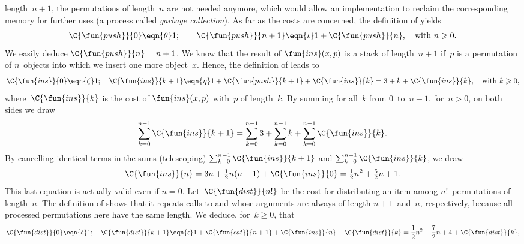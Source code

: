 length~\(n+1\), the permutations of length~\(n\) are not needed
anymore, which would allow an implementation to reclaim the
corresponding memory for further uses (a process called \emph{garbage
  collection}). As far as the costs are
concerned, the definition of  yields
\begin{equation*}
\C{\fun{push}}{0} \eqn{\theta} 1;\qquad
\C{\fun{push}}{n+1} \eqn{\iota} 1 + \C{\fun{push}}{n},\quad
\text{with \(n \geqslant 0\)}.
\end{equation*}
We easily deduce \(\C{\fun{push}}{n} = n +
1\). We know that the result of
\(\fun{ins}(x,p)\) is a stack of length~\(n+1\) if~\(p\) is a
permutation of \(n\)~objects into which we insert one more
object~\(x\). Hence, the definition of  leads to
\begin{equation*}
\C{\fun{ins}}{0}   \eqn{\zeta} 1;\quad
\C{\fun{ins}}{k+1} \eqn{\eta} 1 + \C{\fun{push}}{k+1} +
\C{\fun{ins}}{k} = 3 + k + \C{\fun{ins}}{k}, \quad \text{with \(k
                   \geqslant 0\)},
\end{equation*}
where~\(\C{\fun{ins}}{k}\) is the cost of \(\fun{ins}(x,p)\)
with~\(p\) of length~\(k\). By summing for all~\(k\) from
\(0\)~to~\(n-1\), for~\(n>0\), on both sides we draw
\begin{equation*}
\sum_{k=0}^{n-1}{\C{\fun{ins}}{k+1}}
  = \sum_{k=0}^{n-1}{3} + \sum_{k=0}^{n-1}{k}
     + \sum_{k=0}^{n-1}{\C{\fun{ins}}{k}}.
\end{equation*}
By cancelling identical terms in the sums (telescoping)
\(\sum_{k=0}^{n-1}{\C{\fun{ins}}{k+1}}\) and
\(\sum_{k=0}^{n-1}{\C{\fun{ins}}{k}}\), we draw
\begin{equation*}
\C{\fun{ins}}{n}
  = 3n + \tfrac{1}{2}n(n-1) + \C{\fun{ins}}{0}
  = \tfrac{1}{2}{n^2} + \tfrac{5}{2}{n} + 1.
\end{equation*}
This last equation is actually valid even if \(n =
0\). Let~\(\C{\fun{dist}}{n!}\) be the cost for distributing an item
among \(n!\)~permutations of length~\(n\). The definition of
 shows that it repeats calls to
 and
 whose arguments are always of
length \(n+1\)~and~\(n\), respectively, because all processed
permutations here have the same length. We deduce, for~\(k \geqslant
0\), that
\begin{equation*}
\C{\fun{dist}}{0} \eqn{\delta} 1;\quad
\C{\fun{dist}}{k+1}
  \eqn{\epsilon} 1 + \C{\fun{cat}}{n+1} + \C{\fun{ins}}{n}
                    + \C{\fun{dist}}{k}
  = \frac{1}{2}{n^2} + \frac{7}{2}{n} + 4 + \C{\fun{dist}}{k},
\end{equation*}
